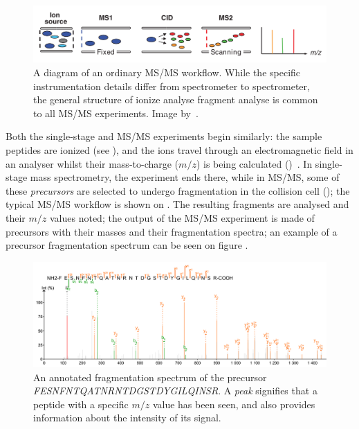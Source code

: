 \begin{figure}
  \centering
  \includegraphics[width=.9\linewidth]{img/msms-workflow.png}
  \caption{A diagram of an ordinary MS/MS workflow. While the specific instrumentation details differ from spectrometer to spectrometer, the general structure of ionize \textrightarrow{} analyse \textrightarrow{} fragment \textrightarrow{} analyse is common to all MS/MS experiments. Image by~\citet{domon2006mass}.}\label{fig:mass-spectrometry-workflow}
\end{figure}

Both the single-stage and MS/MS experiments begin similarly: the sample peptides are ionized (see ), and the ions travel through an electromagnetic field in an analyser whilst their mass-to-charge (\(m/z\)) is being calculated ()~\cite{gross2006mass}. In single-stage mass spectrometry, the experiment ends there, while in MS/MS, some of these \emph{precursors} are selected to undergo fragmentation in the collision cell (); the typical MS/MS workflow is shown on . The resulting fragments are analysed and their \(m/z\) values noted; the output of the MS/MS experiment is made of precursors with their masses and their fragmentation spectra; an example of a precursor fragmentation spectrum can be seen on figure .

\begin{figure}
  \centering
  \includegraphics[width=1\linewidth]{img/fragmentation-spectrum.png}
  \caption{An annotated fragmentation spectrum of the precursor \emph{FESNFNTQATNRNTDGSTDYGILQINSR}. A \emph{peak} signifies that a peptide with a specific \(m/z\) value has been seen, and also provides information about the intensity of its signal.}\label{fig:frag-spectrum}
\end{figure}

